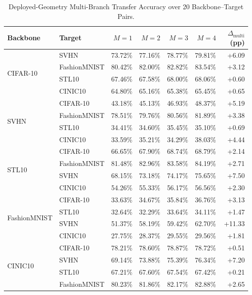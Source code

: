\documentclass[12pt, a4paper]{report}
\numberwithin{equation}{chapter}
\numberwithin{figure}{chapter}
\numberwithin{table}{chapter}
\numberwithin{algorithm}{chapter}
\begin{document}
\begin{table}[p]
\centering
\caption{Deployed-Geometry Multi-Branch Transfer Accuracy over 20 Backbone--Target Pairs.}
\label{tab:multibranch_acc16}
\renewcommand{\arraystretch}{1.0}%
\begin{tabular}{llrrrrr}
\toprule
\textbf{Backbone} & \textbf{Target} & \textbf{$M{=}1$} & \textbf{$M{=}2$} & \textbf{$M{=}3$} & \textbf{$M{=}4$} & \textbf{$\Delta_{\text{multi}}$ (pp)} \\
\midrule
\multirow{4}{*}{CIFAR-10} & SVHN & 73.72\% & 77.16\% & 78.77\% & 79.81\% & +6.09 \\
 & FashionMNIST & 80.42\% & 82.00\% & 82.82\% & 83.54\% & +3.12 \\
 & STL10 & 67.46\% & 67.58\% & 68.00\% & 68.06\% & +0.60 \\
 & CINIC10 & 64.80\% & 65.16\% & 65.38\% & 65.45\% & +0.65 \\
\midrule
\multirow{4}{*}{SVHN} & CIFAR-10 & 43.18\% & 45.13\% & 46.93\% & 48.37\% & +5.19 \\
 & FashionMNIST & 78.51\% & 79.76\% & 80.56\% & 81.89\% & +3.38 \\
 & STL10 & 34.41\% & 34.60\% & 35.45\% & 35.10\% & +0.69 \\
 & CINIC10 & 33.59\% & 35.21\% & 34.29\% & 38.03\% & +4.44 \\
\midrule
\multirow{4}{*}{STL10} & CIFAR-10 & 66.65\% & 67.90\% & 68.74\% & 68.79\% & +2.14 \\
 & FashionMNIST & 81.48\% & 82.96\% & 83.58\% & 84.19\% & +2.71 \\
 & SVHN & 68.15\% & 73.18\% & 74.17\% & 75.65\% & +7.50 \\
 & CINIC10 & 54.26\% & 55.33\% & 56.17\% & 56.56\% & +2.30 \\
\midrule
\multirow{4}{*}{FashionMNIST} & CIFAR-10 & 33.63\% & 34.67\% & 35.84\% & 36.76\% & +3.13 \\
 & STL10 & 32.64\% & 32.29\% & 33.64\% & 34.11\% & +1.47 \\
 & SVHN & 51.37\% & 58.19\% & 59.42\% & 62.70\% & +11.33 \\
 & CINIC10 & 27.75\% & 28.37\% & 29.55\% & 29.56\% & +1.81 \\
\midrule
\multirow{4}{*}{CINIC10} & CIFAR-10 & 78.21\% & 78.60\% & 78.87\% & 78.72\% & +0.51 \\
 & SVHN & 69.14\% & 73.88\% & 75.39\% & 76.34\% & +7.20 \\
 & STL10 & 67.21\% & 67.60\% & 67.54\% & 67.42\% & +0.21 \\
 & FashionMNIST & 80.23\% & 81.86\% & 82.17\% & 82.88\% & +2.65 \\

\end{tabular}
\end{table}
\end{document}
